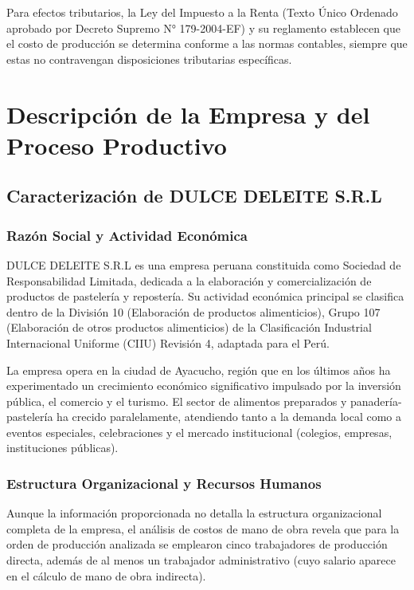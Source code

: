\documentclass[
  stu,
  floatsintext,
  longtable,
  a4paper,
  nolmodern,
  notxfonts,
  notimes,
  12pt,
  colorlinks=true,linkcolor=blue,citecolor=blue,urlcolor=blue]{apa7}
\begin{document}
Para efectos tributarios, la Ley del Impuesto a la Renta (Texto Único
Ordenado aprobado por Decreto Supremo N° 179-2004-EF) y su reglamento
establecen que el costo de producción se determina conforme a las normas
contables, siempre que estas no contravengan disposiciones tributarias
específicas.

\section{Descripción de la Empresa y del Proceso
Productivo}\label{descripciuxf3n-de-la-empresa-y-del-proceso-productivo}

\subsection{Caracterización de DULCE DELEITE
S.R.L}\label{caracterizaciuxf3n-de-dulce-deleite-s.r.l}

\subsubsection{Razón Social y Actividad
Económica}\label{razuxf3n-social-y-actividad-econuxf3mica}

DULCE DELEITE S.R.L es una empresa peruana constituida como Sociedad de
Responsabilidad Limitada, dedicada a la elaboración y comercialización
de productos de pastelería y repostería. Su actividad económica
principal se clasifica dentro de la División 10 (Elaboración de
productos alimenticios), Grupo 107 (Elaboración de otros productos
alimenticios) de la Clasificación Industrial Internacional Uniforme
(CIIU) Revisión 4, adaptada para el Perú.

La empresa opera en la ciudad de Ayacucho, región que en los últimos
años ha experimentado un crecimiento económico significativo impulsado
por la inversión pública, el comercio y el turismo. El sector de
alimentos preparados y panadería-pastelería ha crecido paralelamente,
atendiendo tanto a la demanda local como a eventos especiales,
celebraciones y el mercado institucional (colegios, empresas,
instituciones públicas).

\subsubsection{Estructura Organizacional y Recursos
Humanos}\label{estructura-organizacional-y-recursos-humanos}

Aunque la información proporcionada no detalla la estructura
organizacional completa de la empresa, el análisis de costos de mano de
obra revela que para la orden de producción analizada se emplearon cinco
trabajadores de producción directa, además de al menos un trabajador
administrativo (cuyo salario aparece en el cálculo de mano de obra
indirecta).
\end{document}
